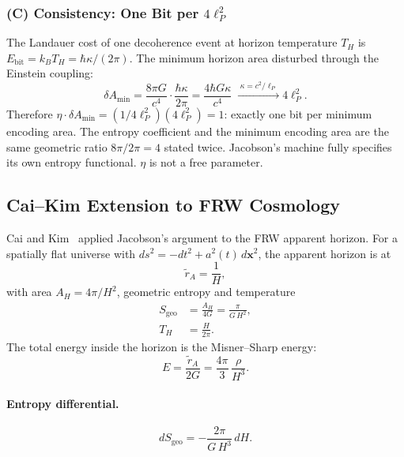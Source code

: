 \documentclass[11pt]{article}
\begin{document}
\subsubsection*{(C) Consistency: One Bit per $4\ell_P^2$}

The Landauer cost of one decoherence event at horizon temperature $T_H$
is $E_\mathrm{bit} = k_B T_H = \hbar\kappa/(2\pi)$.  The minimum
horizon area disturbed through the Einstein coupling:
\begin{equation}
\delta A_\mathrm{min}
= \frac{8\pi G}{c^4}\cdot\frac{\hbar\kappa}{2\pi}
= \frac{4\hbar G\kappa}{c^4}
\;\xrightarrow{\;\kappa = c^2/\ell_P\;}
4\ell_P^2.
\end{equation}
Therefore $\eta \cdot \delta A_\mathrm{min} =
(1/4\ell_P^2)(4\ell_P^2) = 1$: exactly one bit per minimum encoding
area.  The entropy coefficient and the minimum encoding area are the
same geometric ratio $8\pi/2\pi = 4$ stated twice.  Jacobson's machine
fully specifies its own entropy functional.  $\eta$ is not a free
parameter.

\subsection{Cai--Kim Extension to FRW Cosmology}
\label{sec:caikim_detail}

Cai and Kim~\citep{CaiKim2005} applied Jacobson's argument to the FRW
apparent horizon.  For a spatially flat universe with
$ds^2 = -dt^2 + a^2(t)\,d\mathbf{x}^2$, the apparent horizon is at
\begin{equation}
\tilde{r}_A = \frac{1}{H},
\label{eq:apparent_horizon}
\end{equation}
with area $A_H = 4\pi/H^2$, geometric entropy and temperature
\begin{align}
S_\mathrm{geo} &= \frac{A_H}{4G} = \frac{\pi}{G\,H^2}, \label{eq:Sgeo}\\
T_H &= \frac{H}{2\pi}. \label{eq:T_horizon}
\end{align}
The total energy inside the horizon is the Misner--Sharp energy:
\begin{equation}
E = \frac{\tilde{r}_A}{2G} = \frac{4\pi}{3}\,\frac{\rho}{H^3}.
\label{eq:misner_sharp}
\end{equation}

\paragraph{Entropy differential.}
\begin{equation}
dS_\mathrm{geo} = -\frac{2\pi}{G\,H^3}\,dH.
\label{eq:dSgeo}
\end{equation}
\end{document}
